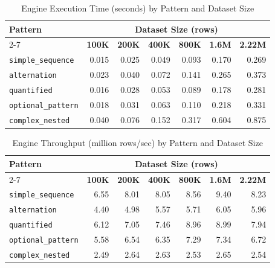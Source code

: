 \documentclass[preprint,12pt,times,a4paper]{elsarticle}
\begin{document}
\begin{table}[t]
\centering\small

\begin{tabular}{@{\extracolsep{\fill}}lrrrrrr}
\toprule
\textbf{Pattern} & \multicolumn{6}{c}{\textbf{Dataset Size (rows)}} \\
\cmidrule(lr){2-7}
 & \textbf{100K} & \textbf{200K} & \textbf{400K} & \textbf{800K} & \textbf{1.6M} & \textbf{2.22M} \\
\midrule
\texttt{simple\_sequence} & 0.015 & 0.025 & 0.049 & 0.093 & 0.170 & 0.269 \\
\texttt{alternation} & 0.023 & 0.040 & 0.072 & 0.141 & 0.265 & 0.373 \\
\texttt{quantified} & 0.016 & 0.028 & 0.053 & 0.089 & 0.178 & 0.281 \\
\texttt{optional\_pattern} & 0.018 & 0.031 & 0.063 & 0.110 & 0.218 & 0.331 \\
\texttt{complex\_nested} & 0.040 & 0.076 & 0.152 & 0.317 & 0.604 & 0.875 \\
\bottomrule
\end{tabular}
\caption{Engine Execution Time (seconds) by Pattern and Dataset Size}
\label{tab:execution_times}
\end{table}

\begin{table}[t]
\centering\small

\begin{tabular}{@{\extracolsep{\fill}}lrrrrrr}
\toprule
\textbf{Pattern} & \multicolumn{6}{c}{\textbf{Dataset Size (rows)}} \\
\cmidrule(lr){2-7}
 & \textbf{100K} & \textbf{200K} & \textbf{400K} & \textbf{800K} & \textbf{1.6M} & \textbf{2.22M} \\
\midrule
\texttt{simple\_sequence} & 6.55 & 8.01 & 8.05 & 8.56 & 9.40 & 8.23 \\
\texttt{alternation} & 4.40 & 4.98 & 5.57 & 5.71 & 6.05 & 5.96 \\
\texttt{quantified} & 6.12 & 7.05 & 7.46 & 8.96 & 8.99 & 7.94 \\
\texttt{optional\_pattern} & 5.58 & 6.54 & 6.35 & 7.29 & 7.34 & 6.72 \\
\texttt{complex\_nested} & 2.49 & 2.64 & 2.63 & 2.53 & 2.65 & 2.54 \\
\bottomrule
\end{tabular}
\caption{Engine Throughput (million rows/sec) by Pattern and Dataset Size}
\label{tab:throughput}
\end{table}
\end{document}
